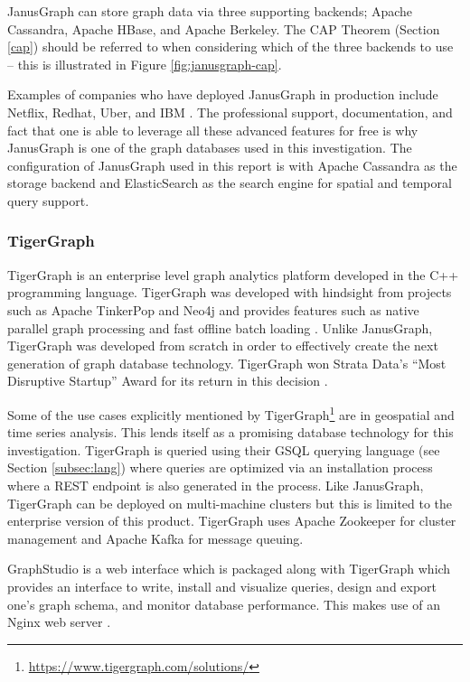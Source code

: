 JanusGraph can store graph data via three supporting backends; Apache Cassandra, Apache HBase, and Apache Berkeley. The CAP Theorem (Section \ref{cap}) should be referred to when considering which of the three backends to use -- this is illustrated in Figure \ref{fig:janusgraph-cap}.

Examples of companies who have deployed JanusGraph in production include Netflix, Redhat, Uber, and IBM \cite{janusgraph-readme}. The professional support, documentation, and fact that one is able to leverage all these advanced features for free is why JanusGraph is one of the graph databases used in this investigation. The configuration of JanusGraph used in this report is with Apache Cassandra as the storage backend and ElasticSearch as the search engine for spatial and temporal query support.

\subsubsection{TigerGraph}

TigerGraph is an enterprise level graph analytics platform developed in the C++ programming language. TigerGraph was developed with hindsight from projects such as Apache TinkerPop and Neo4j and provides features such as native parallel graph processing and fast offline batch loading \cite{tigergraph-benchmark} \cite{conference-trip}. Unlike JanusGraph, TigerGraph was developed from scratch in order to effectively create the next generation of graph database technology. TigerGraph won Strata Data’s ``Most Disruptive Startup'' Award for its return in this decision \cite{tigergraph-award}.

Some of the use cases explicitly mentioned by TigerGraph\footnote{\url{https://www.tigergraph.com/solutions/}} are in geospatial and time series analysis. This lends itself as a promising database technology for this investigation. TigerGraph is queried using their GSQL querying language (see Section \ref{subsec:lang}) where queries are optimized via an installation process where a REST endpoint is also generated in the process. Like JanusGraph, TigerGraph can be deployed on multi-machine clusters but this is limited to the enterprise version of this product. TigerGraph uses Apache Zookeeper for cluster management and Apache Kafka for message queuing.

GraphStudio is a web interface which is packaged along with TigerGraph which provides an interface to write, install and visualize queries, design and export one's graph schema, and monitor database performance. This makes use of an Nginx web server \cite{tigergraph-infoworld}.

